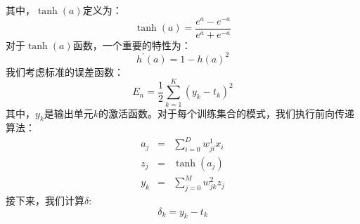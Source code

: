 \documentclass[10pt,a4paper,UTF8]{article}
\begin{document}
其中，\(\tanh(a)\)定义为：
\begin{equation}
\label{eq:46}
\tanh(a) = \frac{e^{a} - e^{-a}}{e^{a} + e^{-a}}
\end{equation}
对于\(\tanh(a)\)函数，一个重要的特性为：
\begin{equation}
\label{eq:47}
h^{'}(a) = 1- h(a)^{2}
\end{equation}
我们考虑标准的误差函数：
\begin{equation}
\label{eq:48}
E_{n} = \frac{1}{2}\sum_{k=1}^{K}(y_{k} - t_{k})^{2}
\end{equation}
其中，\(y_{k}\)是输出单元\(k\)的激活函数。对于每个训练集合的模式，我们执行前向传递算法：
\begin{eqnarray}
\label{eq:49}
a_{j}&=&\sum_{i=0}^{D}w_{ji}^{1}x_{i} \\
z_{j}&=&\tanh(a_{j}) \\
y_{k}&=&\sum_{j=0}^{M}w_{jk}^{2} z_{j}
\end{eqnarray}
接下来，我们计算\(\delta\):
\begin{equation}
\label{eq:50}
\delta_{k} = y_{k} - t_{k}
\end{equation}
\end{document}
